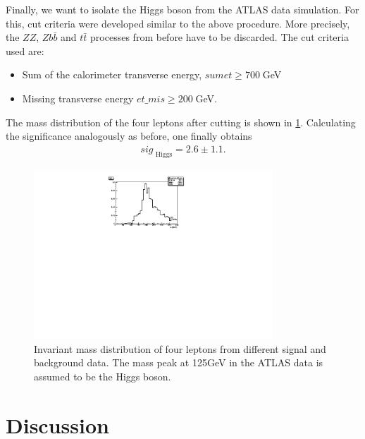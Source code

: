 \documentclass[twoside,        %
               BCOR12mm,       %
               ngerman,english, %
               fleqn,headsepline=false,footsepline=false
              ]{Vorlage/MFPREPORT}
\begin{document}
Finally, we want to isolate the Higgs boson from the ATLAS data simulation. For
this, cut criteria were developed similar to the above procedure. More
precisely, the $ZZ$, $Zb\bar b$ and $t\bar t$ processes from before have to be
discarded. The cut criteria used are:
\begin{itemize}
    \item Sum of the calorimeter transverse energy, $sumet\geq 700\;$GeV
    \item Missing transverse energy $et\_mis\geq200\;$GeV.
\end{itemize}
The mass distribution of the four leptons after cutting is shown in
\cref{fig:higgsmass}.
Calculating the significance analogously as before, one finally obtains
\begin{align}
    \label{eq:fastfertig}
    sig_{\text{ Higgs}}=2.6\pm1.1.
\end{align}
\begin{figure}[]
    \begin{center}
        \includegraphics[width=0.8\textwidth]{ZZ/Higgs_mass_cut.pdf}
    \end{center}
    \caption{Invariant mass distribution of four leptons from different signal
    and background data. The mass peak at 125\;GeV in the ATLAS data is assumed to be the Higgs boson. }
    \label{fig:higgsmass}
\end{figure}


\section{Discussion}
\label{sec:discussion}
\end{document}
